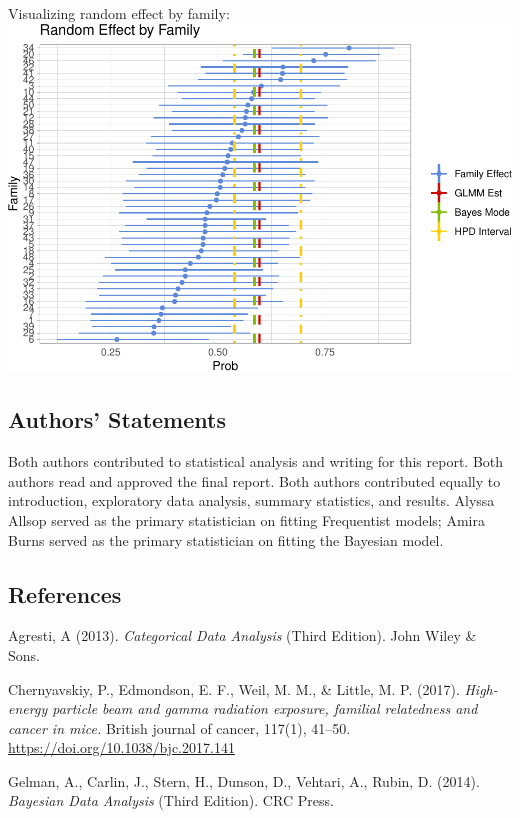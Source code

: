 \documentclass[
]{article}
\begin{document}
Visualizing random effect by family:\\
\includegraphics{final_report_files/figure-latex/re_plot-1.pdf}

\hypertarget{authors-statements}{%
\subsection{Authors' Statements}\label{authors-statements}}

Both authors contributed to statistical analysis and writing for this
report. Both authors read and approved the final report. Both authors
contributed equally to introduction, exploratory data analysis, summary
statistics, and results. Alyssa Allsop served as the primary
statistician on fitting Frequentist models; Amira Burns served as the
primary statistician on fitting the Bayesian model.

\hypertarget{references}{%
\subsection{References}\label{references}}

Agresti, A (2013). \emph{Categorical Data Analysis} (Third Edition).
John Wiley \& Sons.

Chernyavskiy, P., Edmondson, E. F., Weil, M. M., \& Little, M. P.
(2017). \emph{High-energy particle beam and gamma radiation exposure,
familial relatedness and cancer in mice.} British journal of cancer,
117(1), 41--50. \url{https://doi.org/10.1038/bjc.2017.141}

Gelman, A., Carlin, J., Stern, H., Dunson, D., Vehtari, A., Rubin, D.
(2014). \emph{Bayesian Data Analysis} (Third Edition). CRC Press.
\end{document}

